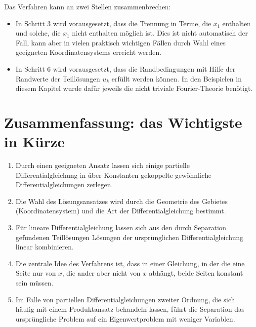 Das Verfahren kann an zwei Stellen zusammenbrechen:
\begin{itemize}
\item In Schritt 3 wird vorausgesetzt, dass die Trennung in 
Terme, die $x_1$ enthalten  und solche, die $x_1$ nicht enthalten
möglich ist. Dies ist nicht automatisch der Fall, kann aber in
vielen praktisch wichtigen Fällen durch Wahl eines geeigneten
Koordinatensystems erreicht werden.
\item In Schritt 6 wird vorausgesetzt, dass die Randbedingungen
mit Hilfe der Randwerte der Teillösungen $u_k$ erfüllt werden
können. In den Beispielen in diesem Kapitel wurde dafür jeweils
die nicht triviale Fourier-Theorie benötigt. 
\end{itemize}

\section{Zusammenfassung: das Wichtigste in Kürze}
\begin{enumerate}
\item
Durch einen geeigneten Ansatz lassen sich einige partielle
Differentialgleichung in über Konstanten gekoppelte gewöhnliche
Differentialgleichungen zerlegen.
\item
Die Wahl des Lösungsansatzes wird durch die Geometrie des Gebietes
(Koordinatensystem) und die Art der Differentialgleichung bestimmt.
\item
Für lineare Differentialgleichung lassen sich aus den durch Separation
gefundenen Teil\-lö\-sungen Lösungen der ursprünglichen Differentialgleichung
linear kombinieren.
\item
Die zentrale Idee des Verfahrens ist, dass in einer Gleichung,
in der die eine Seite nur von $x$, die ander aber nicht von $x$
abhängt, beide Seiten konstant sein müssen.
\item
Im Falle von partiellen Differentialgleichungen zweiter Ordnung, die
sich häufig mit einem Produktansatz behandeln lassen, führt die
Separation das ursprüngliche Problem auf ein Eigenwertproblem mit
weniger Variablen.
\end{enumerate}
